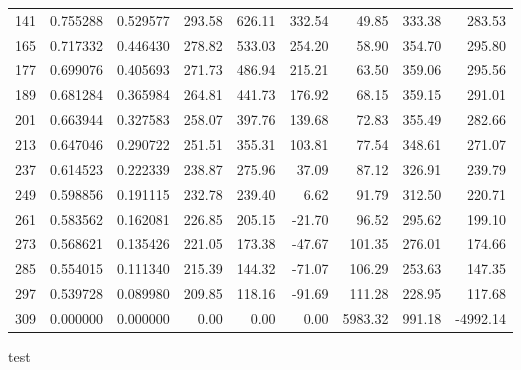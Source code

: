 {\begin{landscape}
\begin{minipage}{\linewidth}
\begin{tabular}{rrrrrrrrr}
    141   & 0.755288 & 0.529577 & 293.58 & 626.11 & 332.54 & 49.85 & 333.38 & 283.53 \\
    165   & 0.717332 & 0.446430 & 278.82 & 533.03 & 254.20 & 58.90 & 354.70 & 295.80 \\
    177   & 0.699076 & 0.405693 & 271.73 & 486.94 & 215.21 & 63.50 & 359.06 & 295.56 \\
    189   & 0.681284 & 0.365984 & 264.81 & 441.73 & 176.92 & 68.15 & 359.15 & 291.01 \\
    201   & 0.663944 & 0.327583 & 258.07 & 397.76 & 139.68 & 72.83 & 355.49 & 282.66 \\
    213   & 0.647046 & 0.290722 & 251.51 & 355.31 & 103.81 & 77.54 & 348.61 & 271.07 \\
    237   & 0.614523 & 0.222339 & 238.87 & 275.96 & 37.09 & 87.12 & 326.91 & 239.79 \\
    249   & 0.598856 & 0.191115 & 232.78 & 239.40 & 6.62  & 91.79 & 312.50 & 220.71 \\
    261   & 0.583562 & 0.162081 & 226.85 & 205.15 & -21.70 & 96.52 & 295.62 & 199.10 \\
    273   & 0.568621 & 0.135426 & 221.05 & 173.38 & -47.67 & 101.35 & 276.01 & 174.66 \\
    285   & 0.554015 & 0.111340 & 215.39 & 144.32 & -71.07 & 106.29 & 253.63 & 147.35 \\
    297   & 0.539728 & 0.089980 & 209.85 & 118.16 & -91.69 & 111.28 & 228.95 & 117.68 \\
    309   & 0.000000 & 0.000000 & 0.00  & 0.00  & 0.00  & 5983.32 & 991.18 & -4992.14 \\
    \bottomrule
    \end{tabular}%
    \label{tab:PVFP_sensitivity}%
    \end{minipage}
    \end{landscape}
    }
    
test